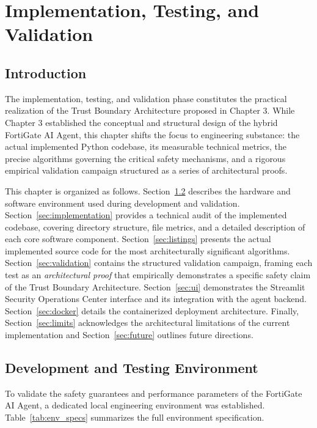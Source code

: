 
\chapter{Implementation, Testing, and Validation}


\section{Introduction}
The implementation, testing, and validation phase constitutes the practical realization of the Trust Boundary Architecture proposed in Chapter 3. While Chapter 3 established the conceptual and structural design of the hybrid FortiGate AI Agent, this chapter shifts the focus to engineering substance: the actual implemented Python codebase, its measurable technical metrics, the precise algorithms governing the critical safety mechanisms, and a rigorous empirical validation campaign structured as a series of architectural proofs.

This chapter is organized as follows. Section~\ref{sec:env} describes the hardware and software environment used during development and validation. Section~\ref{sec:implementation} provides a technical audit of the implemented codebase, covering directory structure, file metrics, and a detailed description of each core software component. Section~\ref{sec:listings} presents the actual implemented source code for the most architecturally significant algorithms. Section~\ref{sec:validation} contains the structured validation campaign, framing each test as an \emph{architectural proof} that empirically demonstrates a specific safety claim of the Trust Boundary Architecture. Section~\ref{sec:ui} demonstrates the Streamlit Security Operations Center interface and its integration with the agent backend. Section~\ref{sec:docker} details the containerized deployment architecture. Finally, Section~\ref{sec:limits} acknowledges the architectural limitations of the current implementation and Section~\ref{sec:future} outlines future directions.

\section{Development and Testing Environment}
\label{sec:env}

To validate the safety guarantees and performance parameters of the FortiGate AI Agent, a dedicated local engineering environment was established. Table~\ref{tab:env_specs} summarizes the full environment specification.

